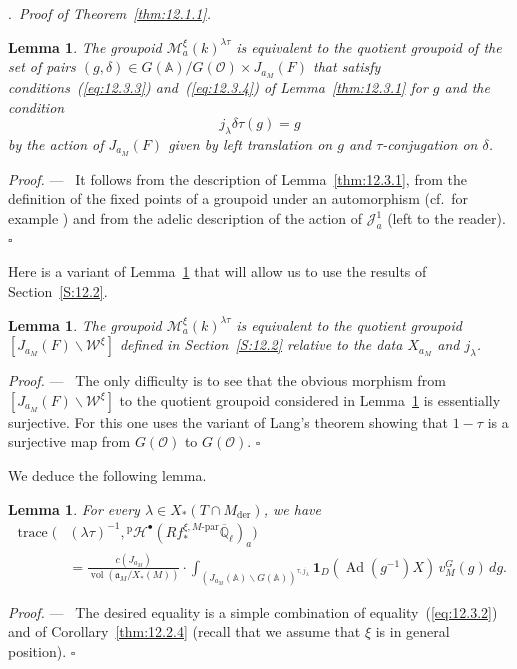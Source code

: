 \documentclass[12pt,a4paper,oneside,english,leqno]{smfart}
\makeatletter
\numberwithin{equation}{subsection}
\newcounter{theo}
\numberwithin{theo}{subsection}
\newenvironment{paragr}[1][]{\medskip\refstepcounter{subsection}%
  \par\noindent\hspace*{\parindent}\thesubsection.\ \emph{#1}%
  \@ifundefined{@empty}{}{}\ignorespaces}{\medskip}
\theoremstyle{plain}
\newtheorem{lemma}[theo]{Lemma}
\theoremstyle{definition}
\theoremstyle{remark}
\newenvironment{preuve}[1][]{\medskip\noindent\textit{Proof.} #1 ---\ }%
  {\hfill\ensuremath{\square}\medskip}
\DeclareMathOperator{\vol}{vol}
\DeclareMathOperator{\Ad}{Ad}
\DeclareMathOperator{\der}{der}
\DeclareMathOperator{\trace}{trace}
\newcommand{\AAA}{\mathbb{A}}
\newcommand{\Qlb}{\overline{\mathbb{Q}}_{\ell}}
\newcommand{\oc}{\mathcal{O}}
\newcommand{\wc}{\mathcal{W}}
\newcommand{\mc}{\mathcal{M}}
\newcommand{\hc}{\mathcal{H}}
\newcommand{\Jc}{\mathcal{J}}
\newcommand{\ago}{\mathfrak{a}}
\newcommand{\la}{\lambda}
\newcommand{\back}{\backslash}
\makeatother
\begin{document}
\begin{paragr}[Proof of Theorem~\ref{thm:12.1.1}.]
\begin{lemma}\label{thm:12.3.2}
The groupoid $\mc_a^\xi(k)^{\la\tau}$ is equivalent to the quotient groupoid of the set of pairs $(g,\delta)\in G(\AAA)/G(\oc)\times J_{a_M}(F)$ that satisfy conditions~(\ref{eq:12.3.3}) and~(\ref{eq:12.3.4}) of Lemma~\ref{thm:12.3.1} for $g$ and the condition
$$
j_\la\delta\tau(g)=g
$$
by the action of $J_{a_M}(F)$ given by left translation on $g$ and $\tau$-conjugation on $\delta$.
\end{lemma}

\begin{preuve}
It follows from the description of Lemma~\ref{thm:12.3.1}, from the definition of the fixed points of a groupoid under an automorphism (cf.\ for example \cite[\S11.2]{LFPI}) and from the adelic description of the action of $\Jc_a^1$ (left to the reader).
\end{preuve}

Here is a variant of Lemma~\ref{thm:12.3.2} that will allow us to use the results of Section~\ref{S:12.2}.

\begin{lemma}\label{thm:12.3.3}
The groupoid $\mc_a^\xi(k)^{\la\tau}$ is equivalent to the quotient groupoid $[J_{a_M}(F)\back\wc^\xi]$ defined in Section~\ref{S:12.2} relative to the data $X_{a_M}$ and $j_\la$.
\end{lemma}

\begin{preuve}
The only difficulty is to see that the obvious morphism from $[J_{a_M}(F)\back\wc^\xi]$ to the quotient groupoid considered in Lemma~\ref{thm:12.3.2} is essentially surjective. For this one uses the variant of Lang's theorem showing that $1-\tau$ is a surjective map from $G(\oc)$ to $G(\oc)$.
\end{preuve}

We deduce the following lemma.

\begin{lemma}\label{thm:12.3.4}
For every $\la\in X_*(T\cap M_{\der})$, we have
\begin{align*}
\trace(&(\la\tau)^{-1},{}^{\mathrm p}\hc^\bullet(Rf_*^{\xi,M\text{-par}}\Qlb)_a)\\
&=\frac{c(J_{a_M})}{\vol(\ago_M/X_*(M))}\cdot
\int_{(J_{a_M}(\AAA)\back G(\AAA))^{\tau,j_\la}}
\mathbf{1}_D(\Ad(g^{-1})X)\,v_M^G(g)\,dg.
\end{align*}
\end{lemma}

\begin{preuve}
The desired equality is a simple combination of equality~(\ref{eq:12.3.2}) and of Corollary~\ref{thm:12.2.4} (recall that we assume that $\xi$ is in general position).
\end{preuve}


\end{paragr}
\end{document}
